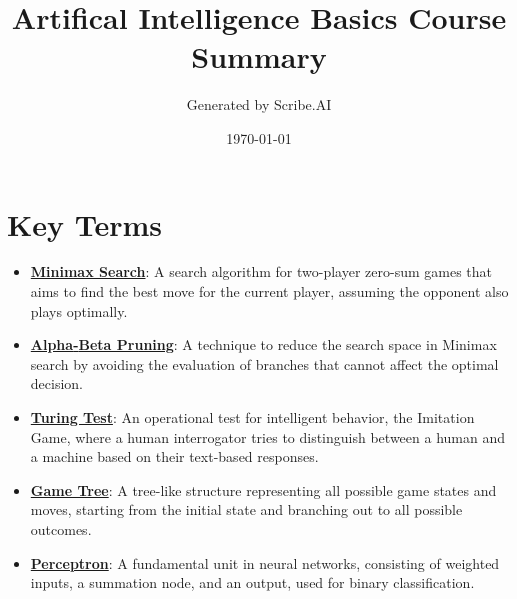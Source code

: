 \documentclass{article}%
\title{Artifical Intelligence Basics Course Summary}%
\author{Generated by Scribe.AI}%
\date{\today}%
\begin{document}
%
\normalsize%
\maketitle%
\section{Key Terms}%
\label{sec:KeyTerms}%
\begin{itemize}[leftmargin=*]%
\item \href{https://purdue.brightspace.com/d2l/common/assets/pdfjs-d2l-dist/1.0.14-legacy/web/viewer.html?file=%2Fcontent%2Fenforced%2F1095467-wl.202510.CS.24300.001%2F02L2-Intro.pdf%3Fou%3D1095467&lang=en-us&container=d2l-fileviewer-rendered-pdf&fullscreen=d2l-fileviewer-rendered-pdf-dialog&height=667#page=22}{\textbf{Minimax Search}}: A search algorithm for two-player zero-sum games that aims to find the best move for the current player, assuming the opponent also plays optimally.%
\item \href{https://purdue.brightspace.com/d2l/common/assets/pdfjs-d2l-dist/1.0.14-legacy/web/viewer.html?file=%2Fcontent%2Fenforced%2F1095467-wl.202510.CS.24300.001%2F02L2-Intro.pdf%3Fou%3D1095467&lang=en-us&container=d2l-fileviewer-rendered-pdf&fullscreen=d2l-fileviewer-rendered-pdf-dialog&height=667#page=23}{\textbf{Alpha{-}Beta Pruning}}: A technique to reduce the search space in Minimax search by avoiding the evaluation of branches that cannot affect the optimal decision.%
\item \href{https://purdue.brightspace.com/d2l/common/assets/pdfjs-d2l-dist/1.0.14-legacy/web/viewer.html?file=%2Fcontent%2Fenforced%2F1095467-wl.202510.CS.24300.001%2F02L2-Intro.pdf%3Fou%3D1095467&lang=en-us&container=d2l-fileviewer-rendered-pdf&fullscreen=d2l-fileviewer-rendered-pdf-dialog&height=667#page=6}{\textbf{Turing Test}}: An operational test for intelligent behavior, the Imitation Game, where a human interrogator tries to distinguish between a human and a machine based on their text-based responses.%
\item \href{https://purdue.brightspace.com/d2l/common/assets/pdfjs-d2l-dist/1.0.14-legacy/web/viewer.html?file=%2Fcontent%2Fenforced%2F1095467-wl.202510.CS.24300.001%2F02L2-Intro.pdf%3Fou%3D1095467&lang=en-us&container=d2l-fileviewer-rendered-pdf&fullscreen=d2l-fileviewer-rendered-pdf-dialog&height=667#page=11}{\textbf{Game Tree}}: A tree-like structure representing all possible game states and moves, starting from the initial state and branching out to all possible outcomes.%
\item \href{https://purdue.brightspace.com/d2l/common/assets/pdfjs-d2l-dist/1.0.14-legacy/web/viewer.html?file=%2Fcontent%2Fenforced%2F1095467-wl.202510.CS.24300.001%2F02L2-Intro.pdf%3Fou%3D1095467&lang=en-us&container=d2l-fileviewer-rendered-pdf&fullscreen=d2l-fileviewer-rendered-pdf-dialog&height=667#page=45}{\textbf{Perceptron}}: A fundamental unit in neural networks, consisting of weighted inputs, a summation node, and an output, used for binary classification.%

\end{itemize}
\end{document}
